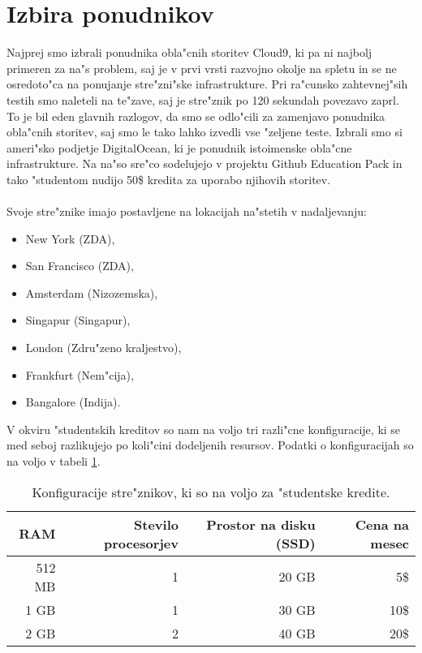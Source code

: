 \section{Izbira ponudnikov}
Najprej smo izbrali ponudnika obla"cnih storitev Cloud9, ki pa ni najbolj primeren za na"s problem, saj je v prvi vrsti razvojno okolje na spletu in se ne osredoto"ca na ponujanje stre"zni"ske infrastrukture. Pri ra"cunsko zahtevnej"sih testih smo naleteli na te"zave, saj je stre"znik po 120 sekundah povezavo zaprl. To je bil eden glavnih razlogov, da smo se odlo"cili za zamenjavo ponudnika obla"cnih storitev, saj smo le tako lahko izvedli vse "zeljene teste. Izbrali smo si ameri"sko podjetje DigitalOcean, ki je ponudnik istoimenske obla"cne infrastrukture. Na na"so sre"co sodelujejo v projektu Github Education Pack in tako "studentom nudijo 50\$ kredita za uporabo njihovih storitev.\\\\Svoje stre"znike imajo postavljene na lokacijah na"stetih v nadaljevanju:
\begin{itemize}
\item New York (ZDA),
\item San Francisco (ZDA),
\item Amsterdam (Nizozemska),
\item Singapur (Singapur),
\item London (Zdru"zeno kraljestvo),
\item Frankfurt (Nem"cija),
\item Bangalore (Indija).
\end{itemize}
V okviru "studentskih kreditov so nam na voljo tri razli"cne konfiguracije, ki se med seboj razlikujejo po koli"cini dodeljenih resursov. Podatki o konfiguracijah so na voljo v tabeli \ref{8_table1}.

\begin{table}[!htbp]
  \centering
  \begin{tabular}{ | r | r | r | r | }
    \hline
    RAM & Stevilo procesorjev & Prostor na disku (SSD) & Cena na mesec\\ \hline
    512 MB & 1     & 20 GB &  5\$ \\ \hline
    1 GB & 1 & 30 GB & 10\$ \\ \hline
    2 GB & 2 & 40 GB & 20\$ \\ \hline
  \end{tabular}
  \caption{Konfiguracije stre"znikov, ki so na voljo za "studentske kredite.}
  \label{8_table1}
  \centering
\end{table}



